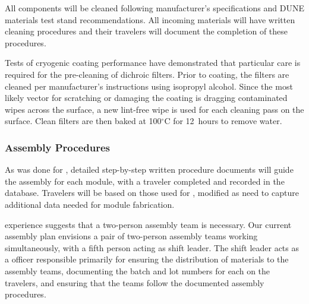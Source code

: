All components will be cleaned %
following manufacturer's specifications and DUNE materials test stand recommendations.  %
All incoming materials will have written cleaning procedures and their travelers will document the completion of these procedures.

Tests of cryogenic coating performance have demonstrated that particular care is required for the pre-cleaning of dichroic filters.  Prior to coating, the filters are cleaned per manufacturer's instructions %
using isopropyl alcohol. Since the most likely vector for scratching or damaging the coating is dragging contaminated wipes across the surface, a new %
lint-free wipe is used for each  cleaning pass on the surface. Clean filters are then baked at 100$^\circ$C for \SI{12}{hours} to remove water. 

\subsubsection{Assembly Procedures}


As was done for , detailed step-by-step written procedure documents will %
guide the assembly for each  module, with a  traveler %
completed and recorded in the database.  Travelers will be based on those used for , modified as need to capture additional data needed for  module fabrication.

 experience suggests that a two-person assembly team is necessary. %
Our current assembly plan envisions a pair of two-person assembly teams working simultaneously, %
with a fifth person acting as shift leader.  The shift leader %
acts as a  officer responsible primarily for ensuring the distribution of materials to the assembly teams, documenting the batch and lot numbers for each  on the %
travelers, and ensuring that the teams follow the documented assembly procedures. %

